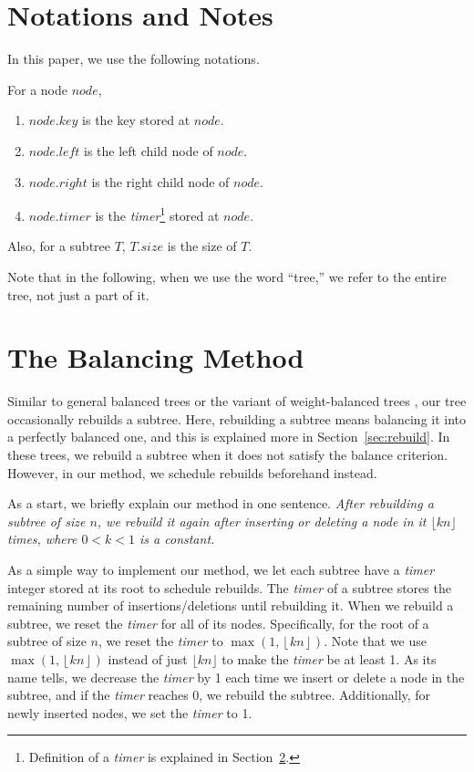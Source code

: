 \documentclass{article}
\begin{document}
\section {Notations and Notes}
In this paper, we use the following notations.

For a node $node$,
\begin{enumerate}[$\bullet$]
    \item $node.key$ is the key stored at $node$.
    \item $node.left$ is the left child node of $node$.
    \item $node.right$ is the right child node of $node$.
    \item $node.timer$ is the \emph{timer}\footnote{Definition of a \emph{timer} is explained in Section~\ref{sec:operations}.} stored at $node$. 
\end{enumerate}

Also, for a subtree $T$, $T.size$ is the size of $T$.

Note that in the following, when we use the word ``tree,'' we refer to the entire tree, not just a part of it.

\section{The Balancing Method}
\label{sec:operations}
Similar to general balanced trees or the variant of weight-balanced trees \cite{Overmars:1987:DDD:535500}, our tree occasionally rebuilds a subtree. Here, rebuilding a subtree means balancing it into a perfectly balanced one, and this is explained more in Section~\ref{sec:rebuild}. In these trees, we rebuild a subtree when it does not satisfy the balance criterion. However, in our method, we schedule rebuilds beforehand instead.

As a start, we briefly explain our method in one sentence.
\newline\newline
\textit{After rebuilding a subtree of size $n$, we rebuild it again after inserting or deleting a node in it $\lfloor kn \rfloor$ times, where $0<k<1$ is a constant.}\newline

As a simple way to implement our method, we let each subtree have a \emph{timer} integer stored at its root to schedule rebuilds. The \emph{timer} of a subtree stores the remaining number of insertions/deletions until rebuilding it. When we rebuild a subtree, we reset the \emph{timer} for all of its nodes. Specifically, for the root of a subtree of size $n$, we reset the \emph{timer} to $\max\left(1,\left\lfloor kn\right\rfloor\right)$. Note that we use $\max\left(1,\left\lfloor kn\right\rfloor\right)$ instead of just $\lfloor kn \rfloor$ to make the \emph{timer} be at least 1. As its name tells, we decrease the \emph{timer} by 1 each time we insert or delete a node in the subtree, and if the \emph{timer} reaches 0, we rebuild the subtree. Additionally, for newly inserted nodes, we set the \emph{timer} to 1.
\end{document}
